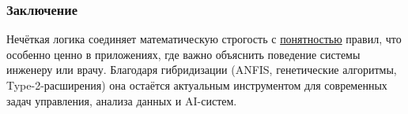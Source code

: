 \subsubsection{Заключение}

Нечёткая логика соединяет
математическую строгость с \underline{понятностью} правил,
что особенно ценно в приложениях,
где важно объяснить поведение системы инженеру или врачу.
Благодаря гибридизации (ANFIS, генетические алгоритмы,
Type-2-расширения) она остаётся актуальным
инструментом для современных задач
управления, анализа данных и AI-систем.

%
